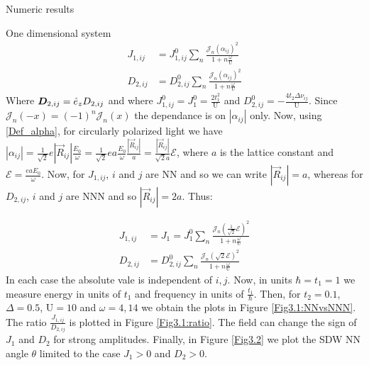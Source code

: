 \begin{section}{Numeric results}
\begin{subsection}{One dimensional system}
\begin{align}
J_{1,ij} &= J_{1,ij}^0  \sum_{n} \frac{\mathcal{J}_n(\alpha_{ij})^2}{1+n\frac{\omega}{\text{U}}} \\
D_{2,ij} &= D_{2,ij}^0  \sum_{n} \frac{\mathcal{J}_n(\alpha_{ij})^2}{1+n\frac{\omega}{\text{U}}}
\end{align}
Where $\boldsymbol{D}_{2,ij} = \hat{e}_z D_{2,ij}$ and where $J_{1,ij}^0 = J_{1}^0 = \frac{2t_1^2}{\text{U}}$ and $D_{2,ij}^0 = -\frac{4t_2\Delta\nu_{ij}}{\text{U}}$. Since $\mathcal{J}_n(-x) = (-1)^n\mathcal{J}_n(x)$ the dependance is on $|\alpha_{ij}|$ only. Now, using \ref{Def_alpha}, for circularly polarized light we have $|\alpha_{ij}| = \frac{1}{\sqrt{2}}e|\vec{R}_{ij}| \frac{E_0}{\omega} = \frac{1}{\sqrt{2}}ea \frac{E_0}{\omega} \frac{|\vec{R}_{ij}|}{a} = \frac{|\vec{R}_{ij}|}{\sqrt{2}a} \mathcal{E}$, where $a$ is the lattice constant and $\mathcal{E} = \frac{eaE_0}{\omega}$. Now, for $J_{1,ij}$, $i$ and $j$ are NN and so we can write $|\vec{R}_{ij}|=a$, whereas for $D_{2,ij}$, $i$ and $j$ are NNN and so $|\vec{R}_{ij}|=2a$. Thus:

\begin{align}
J_{1,ij} &= J_{1} = J_{1}^0  \sum_{n} \frac{\mathcal{J}_n(\frac{1}{\sqrt{2}}\mathcal{E})^2}{1+n\frac{\omega}{\text{U}}} \\
D_{2,ij} &= D_{2,ij}^0  \sum_{n} \frac{\mathcal{J}_n(\sqrt{2}\mathcal{E})^2}{1+n\frac{\omega}{\text{U}}}
\end{align}
In each case the absolute vale is independent of $i,j$.  Now, in units $\hbar=t_1=1$ we measure energy in units of $t_1$ and frequency in units of $\frac{t_1}{\hbar}$. Then, for $t_2 = 0.1$, $\Delta = 0.5$, $\text{U} = 10$ and $\omega = 4, 14$ we obtain the plots in Figure \ref{Fig3.1:NNvsNNN}. The ratio $\frac{J_{1,ij}}{D_{2,ij}}$ is plotted in Figure \ref{Fig3.1:ratio}. The field can change the sign of $J_1$ and $D_2$ for strong amplitudes. Finally, in Figure \ref{Fig3.2} we plot the SDW NN angle $\theta$ limited to the case $J_1 > 0$ and $D_2 > 0$.


\end{subsection}
\end{section}
